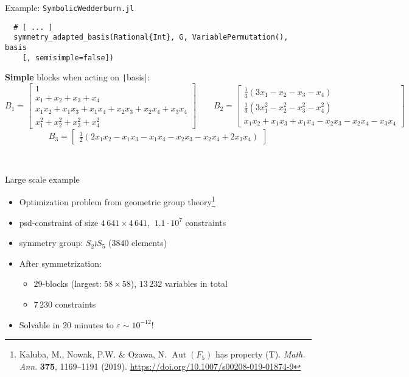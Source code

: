 \begin{frame}[fragile]{Example: {\texttt{SymbolicWedderburn.jl}}}
\vspace*{0.2in}
\scriptsize

\begin{verbatim}
  # [ ... ]
  symmetry_adapted_basis(Rational{Int}, G, VariablePermutation(), basis
    [, semisimple=false])
\end{verbatim}
\normalsize
\textbf{Simple} blocks when acting on \texttt|basis|:
\tiny
\[
  B_1 = \begin{bmatrix}
          1\\
          x_1 + x_2 + x_3 + x_4\\
          x_{1}x_{2} + x_{1}x_{3} + x_{1}x_{4} + x_{2}x_{3} + x_{2}x_{4} + x_{3}x_{4}\\
          x_{1}^{2} + x_{2}^{2} + x_{3}^{2} + x_{4}^{2}
        \end{bmatrix}
  \qquad
  B_2 = \begin{bmatrix}
        \frac{1}{3}(3x_{1} - x_{2} - x_{3} - x_{4})\\
        \frac{1}{3}(3x_{1}^{2} - x_{2}^{2} - x_{3}^{2} - x_{4}^{2})\\
        x_{1}x_{2} + x_{1}x_{3} + x_{1}x_{4} - x_{2}x_{3} - x_{2}x_{4} - x_{3}x_{4}
        \end{bmatrix}
\]
\[
  B_3 = \begin{bmatrix}
        \frac{1}{2}(2x_{1}x_{2} - x_{1}x_{3} - x_{1}x_{4} - x_{2}x_{3} - x_{2}x_{4} + 2x_{3}x_{4})
        \end{bmatrix}
\]

\\[0.1in]

\end{frame}

\begin{frame}{Large scale example}

  \begin{itemize}
    \item Optimization problem from geometric group theory\footnote{Kaluba, M., Nowak, P.W. \& Ozawa, N. $\operatorname{Aut}(F_5)$ has property (T). \textit{Math. Ann}. \textbf{375}, 1169–1191 (2019). \url{https://doi.org/10.1007/s00208-019-01874-9}}
    \item psd-constraint of size $4\,641\times 4\,641$, $~1.1\cdot 10^7$ constraints
    \item symmetry group: $S_2 \wr S_5$ ($3840$ elements)
    \item After symmetrization:
      \begin{itemize}
        \item $29$-blocks (largest: $58\times 58$), $13\,232$ variables in total
        \item $7\,230$ constraints
      \end{itemize}
    \item Solvable in 20 minutes to $\varepsilon \sim 10^{-12} $!
  \end{itemize}

\end{frame}

